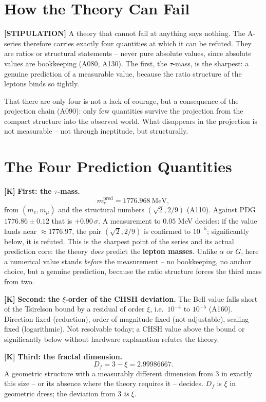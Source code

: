 \section{How the Theory Can Fail}

\textbf{[STIPULATION]} A theory that cannot fail at anything says nothing. The
A-series therefore carries exactly four quantities at which it can be refuted.
They are ratios or structural statements -- never pure absolute values, since
absolute values are bookkeeping (A080, A130). The first, the $\tau$-mass, is the
sharpest: a genuine prediction of a measurable value, because the ratio structure
of the leptons binds so tightly.

That there are only four is not a lack of courage, but a consequence of the
projection chain (A090): only few quantities survive the projection from the
compact structure into the observed world. What disappears in the projection is
not measurable -- not through ineptitude, but structurally.

\section{The Four Prediction Quantities}

\textbf{[K]} \textbf{First: the $\tau$-mass.}
\[
  m_\tau^\text{pred} = 1776{.}968\ \text{MeV},
\]
from $(m_e, m_\mu)$ and the structural numbers $(\sqrt2, 2/9)$ (A110). Against
PDG $1776{.}86\pm0{.}12$ that is $+0{.}90\,\sigma$. A measurement to $0{.}05$ MeV
decides: if the value lands near $\approx 1776{.}97$, the pair $(\sqrt2, 2/9)$ is
confirmed to $10^{-5}$; significantly below, it is refuted. This is the sharpest
point of the series and its actual prediction core: the theory \emph{does} predict
the \textbf{lepton masses}. Unlike $\alpha$ or $G$, here a numerical value stands
\emph{before} the measurement -- no bookkeeping, no anchor choice, but a genuine
prediction, because the ratio structure forces the third mass from two.

\textbf{[K]} \textbf{Second: the $\xi$-order of the CHSH deviation.} The Bell
value falls short of the Tsirelson bound by a residual of order $\xi$, i.e.\
$10^{-4}$ to $10^{-5}$ (A160). Direction fixed (reduction), order of magnitude
fixed (not adjustable), scaling fixed (logarithmic). Not resolvable today; a CHSH
value above the bound or significantly below without hardware explanation refutes
the theory.

\textbf{[K]} \textbf{Third: the fractal dimension.}
\[
  D_f = 3 - \xi = 2{.}99986667 .
\]
A geometric structure with a measurably different dimension from $3$ in exactly
this size -- or its absence where the theory requires it -- decides. $D_f$ is
$\xi$ in geometric dress; the deviation from $3$ \emph{is} $\xi$.

